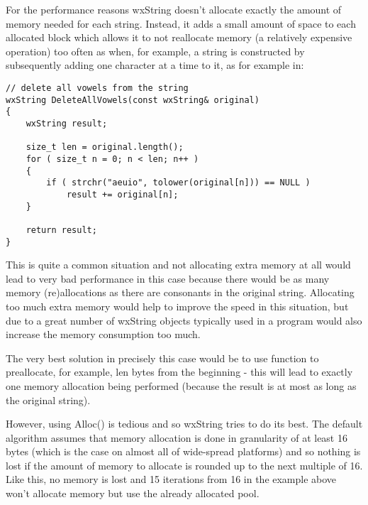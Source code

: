 
For the performance reasons wxString doesn't allocate exactly the amount of
memory needed for each string. Instead, it adds a small amount of space to each
allocated block which allows it to not reallocate memory (a relatively
expensive operation) too often as when, for example, a string is constructed by
subsequently adding one character at a time to it, as for example in:

\begin{verbatim}
// delete all vowels from the string
wxString DeleteAllVowels(const wxString& original)
{
    wxString result;

    size_t len = original.length();
    for ( size_t n = 0; n < len; n++ )
    {
        if ( strchr("aeuio", tolower(original[n])) == NULL )
            result += original[n];
    }

    return result;
}
\end{verbatim}

This is quite a common situation and not allocating extra memory at all would
lead to very bad performance in this case because there would be as many memory
(re)allocations as there are consonants in the original string. Allocating too
much extra memory would help to improve the speed in this situation, but due to
a great number of wxString objects typically used in a program would also
increase the memory consumption too much.

The very best solution in precisely this case would be to use 
 function to preallocate, for example, len bytes
from the beginning - this will lead to exactly one memory allocation being
performed (because the result is at most as long as the original string).

However, using Alloc() is tedious and so wxString tries to do its best. The
default algorithm assumes that memory allocation is done in granularity of at
least 16 bytes (which is the case on almost all of wide-spread platforms) and so
nothing is lost if the amount of memory to allocate is rounded up to the next
multiple of 16. Like this, no memory is lost and 15 iterations from 16 in the
example above won't allocate memory but use the already allocated pool.

